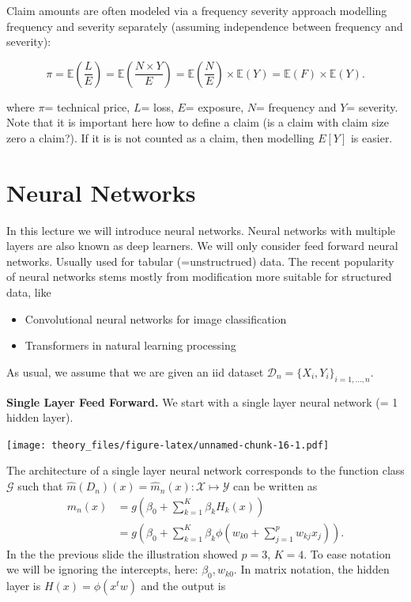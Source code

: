 \documentclass[a4paper,12pt,openany]{book}
\providecommand{\tightlist}{%
 \setlength{\itemsep}{0pt}\setlength{\parskip}{0pt}}
\begin{document}
Claim amounts are often modeled via a frequency severity approach modelling frequency and severity separately (assuming independence between frequency and severity):

\[
\pi=\mathbb{E}\left(\frac{L}{E}\right) = \mathbb{E}\left(\frac{N\times Y}{E}\right)= \mathbb{E}\left(\frac{N}{E}\right) \times  \mathbb{E}\left(Y\right)=\mathbb{E}(F) \times \mathbb{E}(Y).
\]

where \(\pi\)= technical price, \(L\)= loss, \(E\)= exposure, \(N\)= frequency and \(Y\)= severity. Note that it is important here how to define a claim (is a claim with claim size zero a claim?). If it is is not counted as a claim, then modelling \(E[Y]\) is easier.

\hypertarget{neural-networks}{%
\section{Neural Networks}\label{neural-networks}}

In this lecture we will introduce neural networks. Neural networks with multiple layers are also known as deep learners. We will only consider feed forward neural networks. Usually used for tabular (=unstructrued) data. The recent popularity of neural networks stems mostly from modification more suitable for structured data, like

\begin{itemize}
\tightlist
\item
  Convolutional neural networks for image classification
\item
  Transformers in natural learning processing
\end{itemize}

As usual, we assume that we are given an iid dataset \(\mathcal D_n=\{X_i,Y_i\}_{i=1,\dots,n}\).

\textbf{Single Layer Feed Forward.} We start with a single layer neural network (= 1 hidden layer).

\texttt{[image: theory\_files/figure-latex/unnamed-chunk-16-1.pdf]}

The architecture of a single layer neural network corresponds to
the function class \(\mathcal G\) such that
\(\hat m(D_n)(x)=\hat m_n(x): \mathcal X \mapsto \mathcal Y\) can be written as
\begin{align}
\hat m_n(x)&=g\left(\beta_0 + \sum_{k=1}^{K} \beta_kH_k(x)\right)\\
&= g\left(\beta_0 + \sum_{k=1}^{K} \beta_k\phi\left(w_{k0} + \sum_{j=1}^p w_{kj}x_j\right)\right).
\end{align}
In the the previous slide the illustration showed \(p=3\), \(K=4\). To ease notation we will be ignoring the intercepts, here: \(\beta_0, w_{k0}\). In matrix notation, the hidden layer is \(H(x)=\phi(x^tw)\) and the output is
\end{document}
